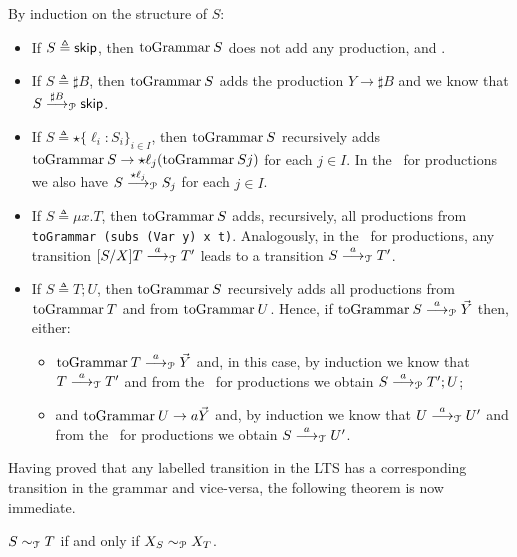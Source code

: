 \begin{itemizeproof}
  By induction on the structure of $S$:
  \begin{itemize}
  \item If $S \triangleq \skipk$, then $\toGrammarf S$ does not add
    any production, and . 
  \item If $S \triangleq \sharp B$, then $\toGrammarf S$ adds the
    production $Y\rightarrow \sharp B$ and we know that
    $S \LTSderivesP[\sharp B] \skipk$.
  \item If $S\triangleq \star \{\ell_i : S_i\}_{i\in I}$, then
    $\toGrammarf S$ recursively adds
    $\toGrammarf S \rightarrow \star \ell_j(\toGrammarf{Sj})$ for each
    $j\in I$. In the \LTS\ for productions we also have
    $S \LTSderivesP[\star\ell_j] S_j$ for each $j\in I$.
  \item If $S\triangleq \mu x.T$, then $\toGrammarf S$ adds,
    recursively, all productions from
    \lstinline|toGrammar (subs (Var y) x t)|.  Analogously, in the
    \LTS\ for productions, any transition $\subs SXT \LTSderives T'$
    leads to a transition $S \LTSderives T'$. 
  \item If $S \triangleq T;U$, then $\toGrammarf S$ recursively adds
    all productions from $\toGrammarf T$ and from $\toGrammarf
    U$. Hence, if $\toGrammarf S \LTSderivesP \vec Y$ then, either:
    \begin{itemize}
    \item $\toGrammarf T \LTSderivesP \vec Y$ and, in this case, by
      induction we know that $T \LTSderives T'$ and from the \LTS\ for
      productions we obtain $S \LTSderivesP T';U$;
    \item {} and $\toGrammarf U \rightarrow a\vec Y$ and, by
      induction we know that $U \LTSderives[a] U'$ and from the \LTS\
      for productions we obtain $S \LTSderives U'$.
    \end{itemize}
  \end{itemize}
\end{itemizeproof}

Having proved that any labelled transition in the LTS has a corresponding
transition in the grammar and vice-versa, the following theorem is now
immediate.

\begin{theorem}
  \label{cfst_vs_grammar}
  $S\TypeEquiv T$  if and only if $ X_S \ProdEquiv X_T$.
\end{theorem}

